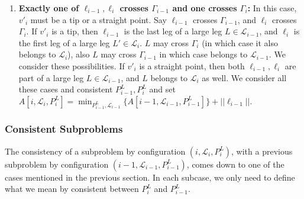 \documentclass[pdflatex,sn-mathphys-num]{sn-jnl}
\theoremstyle{thmstyleone}
\begin{document}
\begin{enumerate}
\begin{enumerate}
        \item \textbf{Exactly one of $\ell_{i-1},\ell_i$ crosses $\Gamma_{i-1}$ and one crosses $\Gamma_i$:}
        In this case, $v'_i$ must be a tip or a straight point. Say $\ell_{i-1}$ crosses $\Gamma_{i-1}$,
        and $\ell_i$ crosses $\Gamma_i$. If $v'_i$ is a tip, then $\ell_{i-1}$ is the last leg of a large leg
        $L\in\mathcal L_{i-1}$, and $\ell_i$ is the first leg of a large leg $L'\in\mathcal L_i$.
        $L$ may cross $\Gamma_i$ (in which case it also belongs to $\mathcal L_i$), also $L$ may cross $\Gamma_{i-1}$ in which case belongs to $\mathcal L_{i-1}$. We consider these possibilities. If $v'_i$ is a straight point, then both $\ell_{i-1},\ell_i$ are part of a large leg $L\in\mathcal L_{i-1}$, and $L$ belongs to $\mathcal L_{i}$ as well. We consider all these cases and consistent $P^L_{i-1},P^L_i$ and set
        $A[i,\mathcal L_i,P^L_i]=\min_{P^L_{i-1},\mathcal L_{i-1}} \{A[i-1,\mathcal L_{i-1},P^L_{i-1}]\}+||\ell_{i-1}||$.
    \end{enumerate} 
\end{enumerate}
\subsubsection*{Consistent Subproblems}\label{def:consistent}
	The consistency of a subproblem by configuration $ (i, \mathcal L_i, P^L_i) $, with a previous subproblem by configuration $ (i-1, \mathcal L_{i - 1}, P^L_{i - 1}) $, comes down to one of the cases mentioned in the previous section. In each subcase, we only need to define what we mean by consistent between $ P^L_i $ and $ P^L_{i - 1} $.
	
\end{document}
